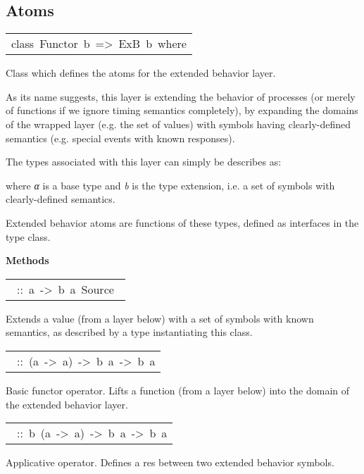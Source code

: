 \subsection{Atoms}
\begin{haddockdesc}
\item[\begin{tabular}{@{}l}
class\ Functor\ b\ =>\ ExB\ b\ where
\end{tabular}]\haddockbegindoc
Class which defines the atoms for the extended behavior layer.\par
As its name suggests, this layer is extending the behavior of
 processes (or merely of functions if we ignore timing semantics
 completely), by expanding the domains of the wrapped layer
 (e.g. the set of values) with symbols having clearly-defined
 semantics (e.g. special events with known responses).\par
The types associated with this layer can simply be describes as:\par
{}\par
where  \emph{α} is a base type and \emph{b} is the type extension,
 i.e. a set of symbols with clearly-defined semantics.\par
Extended behavior atoms are functions of these types, defined as
 interfaces in the  type class.\par

\haddockpremethods{}\textbf{Methods}
\begin{haddockdesc}
\item[\begin{tabular}{@{}l}\haddockid{extend}\ ::\ a\ ->\ b\ a\ Source\ \end{tabular}]
\haddockbegindoc
Extends a value (from a layer below) with a set of symbols with known semantics, as described by a type instantiating this class.\par

\item[\begin{tabular}{@{}l}\haddockid{(/.\textbackslash)}\ ::\ (a\ ->\ a)\ ->\ b\ a\ ->\ b\ a\end{tabular}]
\haddockbegindoc
Basic functor operator. Lifts a function (from a layer below) into the domain of the extended behavior layer.\par

\item[\begin{tabular}{@{}l}\haddockid{(/*\textbackslash)}\ ::\ b\ (a\ ->\ a)\ ->\ b\ a\ ->\ b\ a\end{tabular}]
\haddockbegindoc
Applicative operator. Defines a res between two extended behavior symbols.\par


\end{haddockdesc}
\end{haddockdesc}
